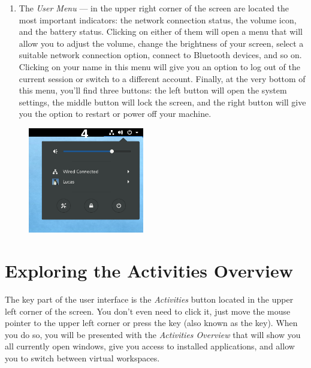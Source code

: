 \begin{enumerate}
\item The \emph{User Menu} --- in the upper right corner of the screen are located the most important indicators: the network connection status, the volume icon, and the battery status. Clicking on either of them will open a menu that will allow you to adjust the volume, change the brightness of your screen, select a suitable network connection option, connect to Bluetooth devices, and so on. Clicking on your name in this menu will give you an option to log out of the current session or switch to a different account. Finally, at the very bottom of this menu, you'll find three buttons: the left button will open the system settings, the middle button will lock the screen, and the right button will give you the option to restart or power off your machine.
\end{enumerate}


\begin{figure}[t]
\begin{center}
\includegraphics[width=0.45\textwidth]{img/menu}
 \label{fig:menu}
\end{center}
\end{figure}

\clearpage
\section*{Exploring the Activities Overview}

The key part of the user interface is the \emph{Activities} button located in the upper left corner of the screen. You don't even need to click it, just move the mouse pointer to the upper left corner or press the  key (also known as the  key). When you do so, you will be presented with the \emph{Activities Overview} that will show you all currently open windows, give you access to installed applications, and allow you to switch between virtual workspaces.

